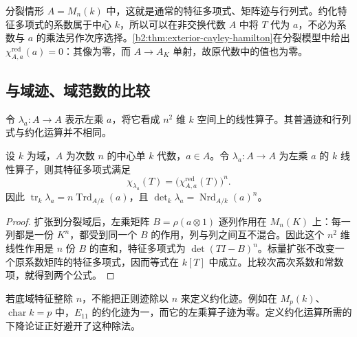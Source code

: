 分裂情形 \(A=M_n(k)\) 中，这就是通常的特征多项式、矩阵迹与行列式。约化特征多项式的系数属于中心 \(k\)，所以可以在非交换代数 \(A\) 中将 \(T\) 代为 \(a\)，不必为系数与 \(a\) 的乘法另作次序选择。\cref{b2:thm:exterior-cayley-hamilton}在分裂模型中给出 \(\chi^{\mathrm{red}}_{A,a}(a)=0\)：其像为零，而 \(A\to A_K\) 单射，故原代数中的值也为零。

\subsection{与域迹、域范数的比较}
\label{b2:subsec:1803:02}

令 \(\lambda_a:A\to A\) 表示左乘 \(a\)，将它看成 \(n^2\) 维 \(k\) 空间上的线性算子。其普通迹和行列式与约化运算并不相同。

\begin{proposition}\label{b2:prop:regular-reduced-characteristic}
	设 \(k\) 为域，\(A\) 为次数 \(n\) 的中心单 \(k\) 代数，\(a\in A\)。令 \(\lambda_a:A\rightarrow A\) 为左乘 \(a\) 的 \(k\) 线性算子，则其特征多项式满足
	\[
		\chi_{\lambda_a}(T)=\bigl(\chi^{\mathrm{red}}_{A,a}(T)\bigr)^n.
	\]
	因此 \(\operatorname{tr}_k\lambda_a=n\operatorname{Trd}_{A/k}(a)\)，且 \(\det_k\lambda_a=\operatorname{Nrd}_{A/k}(a)^n\)。
\end{proposition}
\begin{proof}
	扩张到分裂域后，左乘矩阵 \(B=\rho(a\otimes1)\) 逐列作用在 \(M_n(K)\) 上：每一列都是一份 \(K^n\)，都受到同一个 \(B\) 的作用，列与列之间互不混合。因此这个 \(n^2\) 维线性作用是 \(n\) 份 \(B\) 的直和，特征多项式为 \(\det(TI-B)^n\)。标量扩张不改变一个原系数矩阵的特征多项式，因而等式在 \(k[T]\) 中成立。比较次高次系数和常数项，就得到两个公式。
\end{proof}

若底域特征整除 \(n\)，不能把正则迹除以 \(n\) 来定义约化迹。例如在 \(M_p(k)\)、\(\operatorname{char}k=p\) 中，\(E_{11}\) 的约化迹为一，而它的左乘算子迹为零。定义约化运算所需的下降论证正好避开了这种除法。

